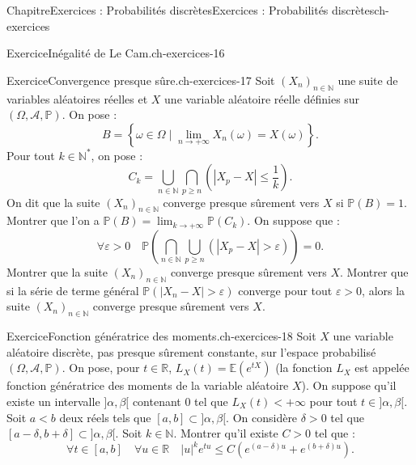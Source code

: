 \documentclass[twoside,10pt,]{book}
\numberwithin{equation}{chapter}
\newcommand{\N}{\mathbb N}
\newcommand{\R}{\mathbb R}
\renewcommand{\Pr}{\mathbb P}
\newcommand{\Es}{\mathbb E}
\newcommand{\lt}{<}
\newcommand{\gt}{>}
\begin{document}
\begin{chapterptx}{Chapitre}{Exercices : Probabilités discrètes}{}{Exercices : Probabilités discrètes}{}{}{ch-exercices}
\begin{inlineexercise}{Exercice}{Inégalité de Le Cam.}{ch-exercices-16}
\end{inlineexercise}%
\begin{inlineexercise}{Exercice}{Convergence presque sûre.}{ch-exercices-17}%
Soit \((X_{n})_{n \in \N}\) une suite de variables aléatoires réelles et \(X\) une variable aléatoire réelle définies sur \((\Omega, \mathcal{A}, \Pr)\). On pose :%
\begin{equation*}
B = \left\{\omega \in \Omega \mid \lim_{n \rightarrow +\infty} X_{n}(\omega) = X(\omega)\right\}.
\end{equation*}
Pour tout \(k \in \N^{*}\), on pose :%
\begin{equation*}
C_{k} = \bigcup_{n \in \N} \bigcap_{p \geqslant n} \left(\left|X_{p} - X\right| \leqslant \frac{1}{k}\right).
\end{equation*}
On dit que la suite \((X_{n})_{n \in \N}\) converge presque sûrement vers \(X\) si \(\Pr(B) = 1\).%
Montrer que l'on a \(\Pr(B) = \lim_{k \rightarrow +\infty} \Pr(C_{k})\).%
On suppose que :%
\begin{equation*}
\forall \varepsilon\gt0 \quad \Pr\left(\bigcap_{n \in \N} \bigcup_{p \geqslant n} \left(|X_{p} - X|\gt\varepsilon\right)\right) = 0.
\end{equation*}
Montrer que la suite \((X_{n})_{n \in \N}\) converge presque sûrement vers \(X\).%
Montrer que si la série de terme général \(\Pr(|X_{n} - X|\gt\varepsilon)\) converge pour tout \(\varepsilon\gt0\), alors la suite \((X_{n})_{n \in \N}\) converge presque sûrement vers \(X\).%
\end{inlineexercise}%
\begin{inlineexercise}{Exercice}{Fonction génératrice des moments.}{ch-exercices-18}%
Soit \(X\) une variable aléatoire discrète, pas presque sûrement constante, sur l'espace probabilisé \((\Omega, \mathcal{A}, \Pr)\). On pose, pour \(t \in \R\), \(L_{X}(t) = \Es(e^{t X})\) (la fonction \(L_{X}\) est appelée fonction génératrice des moments de la variable aléatoire \(X\)). On suppose qu'il existe un intervalle \(]\alpha, \beta[\) contenant 0 tel que \(L_{X}(t) \lt +\infty\) pour tout \(t \in ]\alpha, \beta[\).%
Soit \(a \lt b\) deux réels tels que \([a, b] \subset ]\alpha, \beta[\). On considère \(\delta\gt0\) tel que \([a - \delta, b + \delta] \subset ]\alpha, \beta[\). Soit \(k \in \N\). Montrer qu'il existe \(C\gt0\) tel que :%
\begin{equation*}
\forall t \in [a, b] \quad \forall u \in \R \quad |u|^{k} e^{t u} \leqslant C \left(e^{(a - \delta) u} + e^{(b + \delta) u}\right).
\end{equation*}

\end{inlineexercise}
\end{chapterptx}
\end{document}
